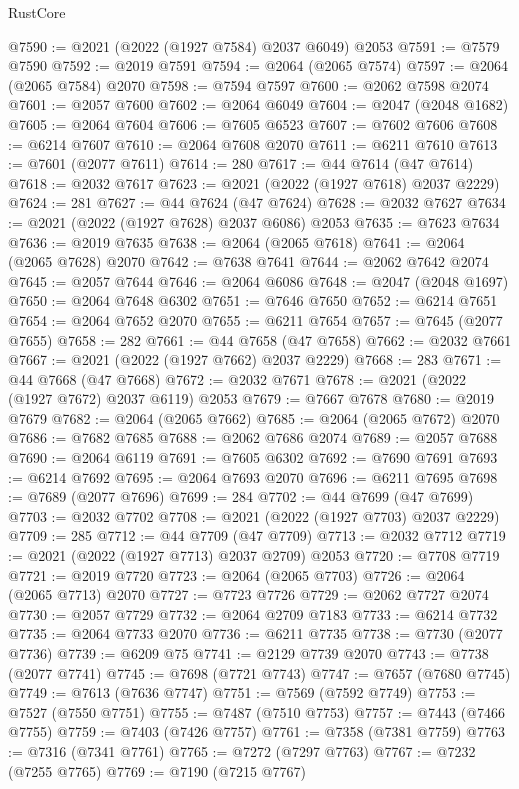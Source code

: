\begin{lexlean}{RustCore}
\begin{coremodule}
@7590 := @2021 (@2022 (@1927 @7584) @2037 @6049) @2053
@7591 := @7579 @7590
@7592 := @2019 @7591
@7594 := @2064 (@2065 @7574)
@7597 := @2064 (@2065 @7584) @2070
@7598 := @7594 @7597
@7600 := @2062 @7598 @2074
@7601 := @2057 @7600
@7602 := @2064 @6049
@7604 := @2047 (@2048 @1682)
@7605 := @2064 @7604
@7606 := @7605 @6523
@7607 := @7602 @7606
@7608 := @6214 @7607
@7610 := @2064 @7608 @2070
@7611 := @6211 @7610
@7613 := @7601 (@2077 @7611)
@7614 := 280
@7617 := @44 @7614 (@47 @7614)
@7618 := @2032 @7617
@7623 := @2021 (@2022 (@1927 @7618) @2037 @2229)
@7624 := 281
@7627 := @44 @7624 (@47 @7624)
@7628 := @2032 @7627
@7634 := @2021 (@2022 (@1927 @7628) @2037 @6086) @2053
@7635 := @7623 @7634
@7636 := @2019 @7635
@7638 := @2064 (@2065 @7618)
@7641 := @2064 (@2065 @7628) @2070
@7642 := @7638 @7641
@7644 := @2062 @7642 @2074
@7645 := @2057 @7644
@7646 := @2064 @6086
@7648 := @2047 (@2048 @1697)
@7650 := @2064 @7648 @6302
@7651 := @7646 @7650
@7652 := @6214 @7651
@7654 := @2064 @7652 @2070
@7655 := @6211 @7654
@7657 := @7645 (@2077 @7655)
@7658 := 282
@7661 := @44 @7658 (@47 @7658)
@7662 := @2032 @7661
@7667 := @2021 (@2022 (@1927 @7662) @2037 @2229)
@7668 := 283
@7671 := @44 @7668 (@47 @7668)
@7672 := @2032 @7671
@7678 := @2021 (@2022 (@1927 @7672) @2037 @6119) @2053
@7679 := @7667 @7678
@7680 := @2019 @7679
@7682 := @2064 (@2065 @7662)
@7685 := @2064 (@2065 @7672) @2070
@7686 := @7682 @7685
@7688 := @2062 @7686 @2074
@7689 := @2057 @7688
@7690 := @2064 @6119
@7691 := @7605 @6302
@7692 := @7690 @7691
@7693 := @6214 @7692
@7695 := @2064 @7693 @2070
@7696 := @6211 @7695
@7698 := @7689 (@2077 @7696)
@7699 := 284
@7702 := @44 @7699 (@47 @7699)
@7703 := @2032 @7702
@7708 := @2021 (@2022 (@1927 @7703) @2037 @2229)
@7709 := 285
@7712 := @44 @7709 (@47 @7709)
@7713 := @2032 @7712
@7719 := @2021 (@2022 (@1927 @7713) @2037 @2709) @2053
@7720 := @7708 @7719
@7721 := @2019 @7720
@7723 := @2064 (@2065 @7703)
@7726 := @2064 (@2065 @7713) @2070
@7727 := @7723 @7726
@7729 := @2062 @7727 @2074
@7730 := @2057 @7729
@7732 := @2064 @2709 @7183
@7733 := @6214 @7732
@7735 := @2064 @7733 @2070
@7736 := @6211 @7735
@7738 := @7730 (@2077 @7736)
@7739 := @6209 @75
@7741 := @2129 @7739 @2070
@7743 := @7738 (@2077 @7741)
@7745 := @7698 (@7721 @7743)
@7747 := @7657 (@7680 @7745)
@7749 := @7613 (@7636 @7747)
@7751 := @7569 (@7592 @7749)
@7753 := @7527 (@7550 @7751)
@7755 := @7487 (@7510 @7753)
@7757 := @7443 (@7466 @7755)
@7759 := @7403 (@7426 @7757)
@7761 := @7358 (@7381 @7759)
@7763 := @7316 (@7341 @7761)
@7765 := @7272 (@7297 @7763)
@7767 := @7232 (@7255 @7765)
@7769 := @7190 (@7215 @7767)

\end{coremodule}
\end{lexlean}
